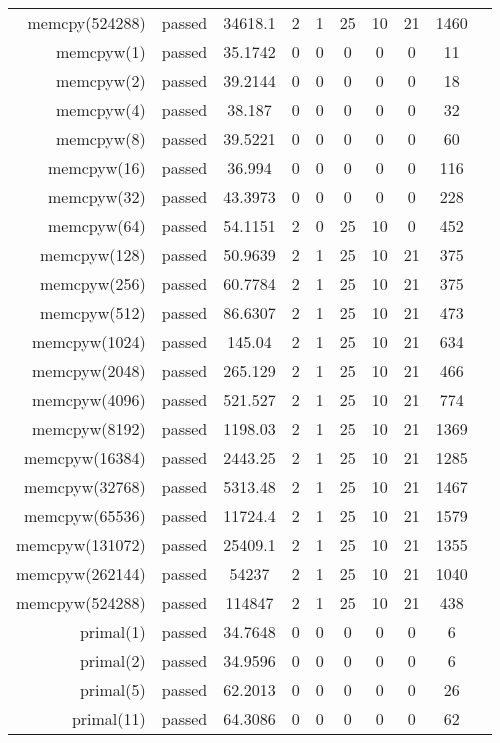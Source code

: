 \begin{longtable}{r|ccccccccc}
    memcpy(524288) & passed & 34618.1 & 2 & 1 & 25 & 10 & 21 & 1460 \\
    memcpyw(1) & passed & 35.1742 & 0 & 0 & 0 & 0 & 0 & 11 \\
    memcpyw(2) & passed & 39.2144 & 0 & 0 & 0 & 0 & 0 & 18 \\
    memcpyw(4) & passed & 38.187 & 0 & 0 & 0 & 0 & 0 & 32 \\
    memcpyw(8) & passed & 39.5221 & 0 & 0 & 0 & 0 & 0 & 60 \\
    memcpyw(16) & passed & 36.994 & 0 & 0 & 0 & 0 & 0 & 116 \\
    memcpyw(32) & passed & 43.3973 & 0 & 0 & 0 & 0 & 0 & 228 \\
    memcpyw(64) & passed & 54.1151 & 2 & 0 & 25 & 10 & 0 & 452 \\
    memcpyw(128) & passed & 50.9639 & 2 & 1 & 25 & 10 & 21 & 375 \\
    memcpyw(256) & passed & 60.7784 & 2 & 1 & 25 & 10 & 21 & 375 \\
    memcpyw(512) & passed & 86.6307 & 2 & 1 & 25 & 10 & 21 & 473 \\
    memcpyw(1024) & passed & 145.04 & 2 & 1 & 25 & 10 & 21 & 634 \\
    memcpyw(2048) & passed & 265.129 & 2 & 1 & 25 & 10 & 21 & 466 \\
    memcpyw(4096) & passed & 521.527 & 2 & 1 & 25 & 10 & 21 & 774 \\
    memcpyw(8192) & passed & 1198.03 & 2 & 1 & 25 & 10 & 21 & 1369 \\
    memcpyw(16384) & passed & 2443.25 & 2 & 1 & 25 & 10 & 21 & 1285 \\
    memcpyw(32768) & passed & 5313.48 & 2 & 1 & 25 & 10 & 21 & 1467 \\
    memcpyw(65536) & passed & 11724.4 & 2 & 1 & 25 & 10 & 21 & 1579 \\
    memcpyw(131072) & passed & 25409.1 & 2 & 1 & 25 & 10 & 21 & 1355 \\
    memcpyw(262144) & passed & 54237 & 2 & 1 & 25 & 10 & 21 & 1040 \\
    memcpyw(524288) & passed & 114847 & 2 & 1 & 25 & 10 & 21 & 438 \\
    primal(1) & passed & 34.7648 & 0 & 0 & 0 & 0 & 0 & 6 \\
    primal(2) & passed & 34.9596 & 0 & 0 & 0 & 0 & 0 & 6 \\
    primal(5) & passed & 62.2013 & 0 & 0 & 0 & 0 & 0 & 26 \\
    primal(11) & passed & 64.3086 & 0 & 0 & 0 & 0 & 0 & 62 \\

\end{longtable}
